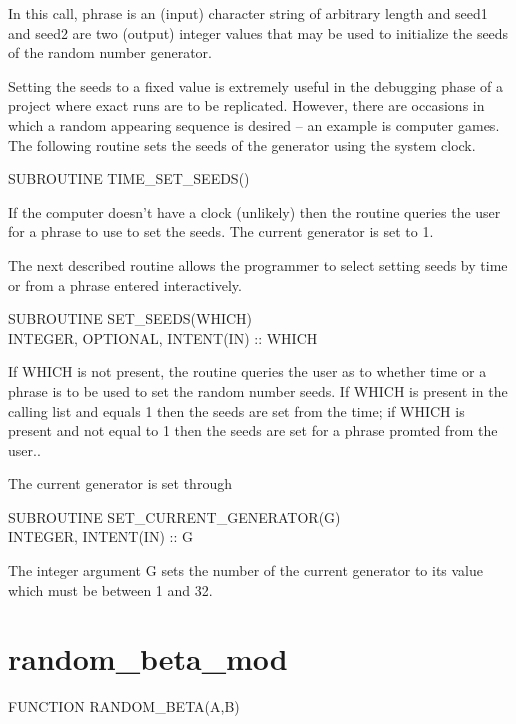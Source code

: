 \documentclass[12pt,dvips]{article}
\newcommand{\mysection}[1]{\color{blue}
            \section{#1} \normalcolor}
\begin{document}
In  this call,  phrase is  an  (input) character  string of  arbitrary
length and seed1 and seed2 are two (output) integer values that may be
used to initialize the seeds of the random number generator.

Setting  the seeds  to  a fixed  value   is  extremely useful  in  the
debugging  phase of a project  where exact runs  are to be replicated.
However, there are occasions  in which a  random appearing sequence is
desired -- an  example is computer games.   The following routine sets
the seeds of the generator using the system clock.  

\vspace{0.2in}
SUBROUTINE TIME\_SET\_SEEDS()
\vspace{0.2in}

If the    computer doesn't have a  clock   (unlikely) then the routine
queries  the user for a  phrase to use to set  the seeds.  The current
generator is set to 1.

The  next  described routine  allows  the programmer to select setting
seeds by time or from a phrase entered interactively.

\vspace{0.2in}
SUBROUTINE SET\_SEEDS(WHICH)\\
\hspace{0.5in} INTEGER, OPTIONAL, INTENT(IN) :: WHICH
\vspace{0.2in}

If WHICH  is not present, the routine  queries the  user as to whether
time or a phrase  is to be  used to set the random  number seeds.   If
WHICH is present  in the calling list and  equals 1 then the seeds are
set from the time;  if WHICH is present and   not equal to 1  then the
seeds are set for a phrase promted from the user..

The current generator is set through 

\vspace{0.2in}
SUBROUTINE SET\_CURRENT\_GENERATOR(G)\\
\hspace{0.5in} INTEGER, INTENT(IN) :: G
\vspace{0.2in}

The integer argument G sets the number of the current generator to its
value which must be between 1 and 32.

\pagebreak

\mysection{random\_beta\_mod}

      FUNCTION RANDOM\_BETA(A,B)
\end{document}
